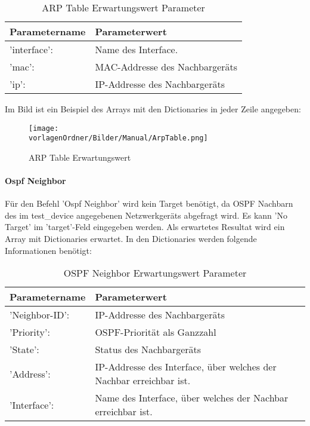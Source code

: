 \documentclass[]{subfiles}
\begin{document}
			\begin{table}
				\begin{tabularx}{\textwidth}{lX}
				\toprule
				Parametername & Parameterwert \\
				\midrule
				'interface': &  Name des Interface. \\
				'mac': &  MAC-Addresse des Nachbargeräts \\
				'ip': & IP-Addresse des Nachbargeräts \\
				\bottomrule
				\end{tabularx}
				\caption{ARP Table Erwartungswert Parameter}
			\end{table}
			

			Im Bild ist ein Beispiel des Arrays mit den Dictionaries in jeder Zeile angegeben:

			\begin{figure}[h!]
				\begin{center}
					\texttt{[image: \\vorlagenOrdner/Bilder/Manual/ArpTable.png]}
					\caption{ARP Table Erwartungswert}
				\end{center}
			\end{figure}

		\paragraph*{Ospf Neighbor}
			Für den Befehl 'Ospf Neighbor' wird kein Target benötigt, 
			da OSPF Nachbarn des im test\_device angegebenen Netzwerkgeräts abgefragt wird. 
			Es kann 'No Target' im 'target'-Feld eingegeben werden.	
			Als erwartetes Resultat wird ein Array mit Dictionaries erwartet. 
			In den Dictionaries werden folgende Informationen benötigt:

			\begin{table}
				\begin{tabularx}{\textwidth}{lX}
				\toprule
				Parametername & Parameterwert\\
				\midrule 
				'Neighbor-ID': & IP-Addresse des Nachbargeräts \\
				'Priority': & OSPF-Priorität als Ganzzahl\\
				'State': & Status des Nachbargeräts \\
				'Address': & IP-Addresse des Interface, über welches der Nachbar erreichbar ist. \\
				'Interface': & Name des Interface, über welches der Nachbar erreichbar ist. \\
				\bottomrule
				\end{tabularx}
				\caption{OSPF Neighbor Erwartungswert Parameter}
			\end{table}
			
\end{document}
